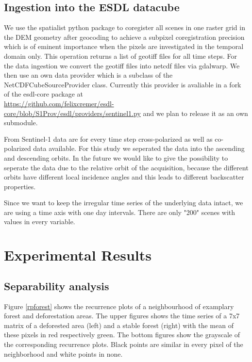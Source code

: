 \documentclass{article}
\begin{document}
\subsection{Ingestion into the ESDL datacube}
We use the spatialist python package \cite{spatialist} to coregister all scenes in one raster grid in the DEM geometry after geocoding to achieve a subpixel coregistration precision which is of eminent importance when the pixels are investigated in the temporal domain only.
This operation returns a list of geotiff files for all time steps.
For the data ingestion we convert the geotiff files into netcdf files via gdalwarp.
We then use an own data provider which is a subclass of the NetCDFCubeSourceProvider class.
Currently this provider is avaliable in a fork of the esdl-core package at \\
\mbox{\url{https://github.com/felixcremer/esdl-core/blob/S1Prov/esdl/providers/sentinel1.py}}
and we plan to release it as an own submodule.

From Sentinel-1 data are for every time step cross-polarized as well as co-polarized data available.
For this study we seperated the data into the ascending and descending orbits.
In the future we would like to give the possibility to seperate the data due to the relative orbit of the acquisition,
because the different orbits have different local incidence angles and this leads to different backscatter properties.

Since we want to keep the irregular time series of the underlying data intact, we are using a time axis with one day intervals.
There are only "200" scenes with values in every variable.



\section{Experimental Results}


\subsection{Separability analysis}

Figure \ref{rpforest} shows the recurrence plots of a neighbourhood of examplary forest and deforestation areas.
The upper figures shows the time series of a 7x7 matrix of a deforested area (left) and a stable forest (right) with the mean of these pixels in red respectively green.
The bottom figures show the grayscale of the corresponding recurrence plots.
Black points are similar in every pixel of the neighborhood and white points in none.
\end{document}
